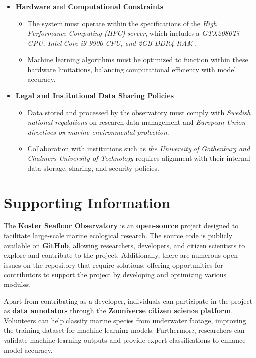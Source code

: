 \begin{itemize}
    \item \textbf{Hardware and Computational Constraints}  
    \begin{itemize}
        \item The system must operate within the specifications of the \textit{High Performance Computing (HPC) server}, which includes a \textit{GTX2080Ti GPU, Intel Core i9-9900 CPU, and 2GB DDR4 RAM} \cite{anton2021kso}.
        \item Machine learning algorithms must be optimized to function within these hardware limitations, balancing computational efficiency with model accuracy.
    \end{itemize}

    \item \textbf{Legal and Institutional Data Sharing Policies}  
    \begin{itemize}
        \item Data stored and processed by the observatory must comply with \textit{Swedish national regulations} on research data management and \textit{European Union directives on marine environmental protection}.
        \item Collaboration with institutions such as \textit{the University of Gothenburg and Chalmers University of Technology} requires alignment with their internal data storage, sharing, and security policies.
    \end{itemize}
\end{itemize}

\section{Supporting Information}
The \textbf{Koster Seafloor Observatory} is an \textbf{open-source} project designed to facilitate large-scale marine ecological research. The source code is publicly available on \textbf{GitHub}, allowing researchers, developers, and citizen scientists to explore and contribute to the project. Additionally, there are numerous open issues on the repository that require solutions, offering opportunities for contributors to support the project by developing and optimizing various modules.

Apart from contributing as a developer, individuals can participate in the project as \textbf{data annotators} through the \textbf{Zooniverse citizen science platform}. Volunteers can help classify marine species from underwater footage, improving the training dataset for machine learning models. Furthermore, researchers can validate machine learning outputs and provide expert classifications to enhance model accuracy.

